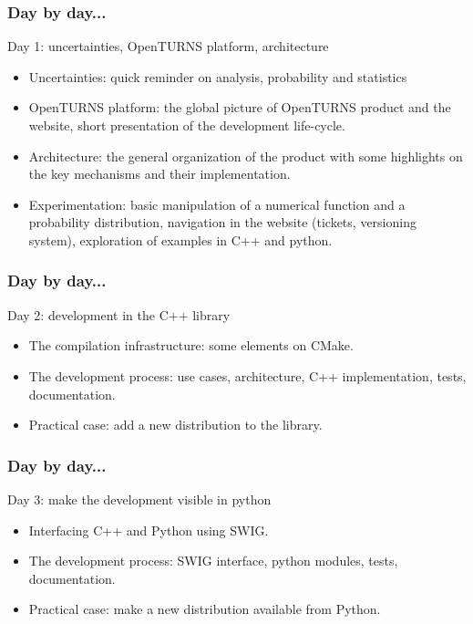 \documentclass{beamer}
\begin{document}
\begin{frame}
  \frametitle{Day by day...}
  \begin{block}{Day 1: uncertainties, OpenTURNS platform, architecture}
    \begin{itemize}
    \item Uncertainties: quick reminder on analysis, probability and statistics
    \item OpenTURNS platform: the global picture of OpenTURNS product and the website, short presentation of the development life-cycle.
    \item Architecture: the general organization of the product with some highlights on the key mechanisms and their implementation.
    \item Experimentation: basic manipulation of a numerical function and a probability distribution, navigation in the website (tickets, versioning system), exploration of examples in C++ and python.
    \end{itemize}
  \end{block}
\end{frame}
\begin{frame}
  \frametitle{Day by day...}
  \begin{block}{Day 2: development in the C++ library}
    \begin{itemize}
    \item The compilation infrastructure: some elements on CMake.
    \item The development process: use cases, architecture, C++ implementation, tests, documentation.
    \item Practical case: add a new distribution to the library.
    \end{itemize}
  \end{block}
\end{frame}
\begin{frame}
  \frametitle{Day by day...}
  \begin{block}{Day 3: make the development visible in python}
    \begin{itemize}
    \item Interfacing C++ and Python using SWIG.
    \item The development process: SWIG interface, python modules, tests, documentation.
    \item Practical case: make a new distribution available from Python.
    \end{itemize}
  \end{block}
\end{frame}
\end{document}
